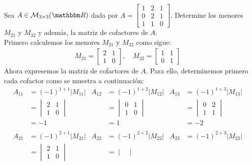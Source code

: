 \begin{example}
    Sea $A \in \mathcal{M}_{3 \times 3}(\RR)$ dada por $A = \begin{bmatrix}
        1 & 2 & 1 \\
        0 & 2 & 1 \\
        1 & 1 & 0
    \end{bmatrix}$. Determine los menores $M_{21}$ y $M_{32}$ y además, la matriz de cofactores de $A$. \\
    \solucion Primero calculemos los menores $M_{21}$ y $M_{32}$ como sigue:
    \begin{align*}
        M_{21} = \begin{bmatrix}
            2 & 1 \\
            1 & 0
        \end{bmatrix}, \quad M_{32} = \begin{bmatrix}
            1 & 1 \\
            0 & 1
        \end{bmatrix}
    \end{align*}
    Ahora expresemos la matriz de cofactores de $A$. Para ello, determinemos primero cada cofactor como se muestra a continuación:
    \begin{align*}
        A_{11} & = (-1)^{1+1} |M_{11}| & A_{12} & = (-1)^{1+2} |M_{12}| & A_{13} & = (-1)^{1+3} |M_{13}| \\
        & = \begin{vmatrix}
            2 & 1 \\
            1 & 0
        \end{vmatrix} & & = \begin{vmatrix}
            0 & 1 \\
            1 & 0
        \end{vmatrix} & & = \begin{vmatrix}
            0 & 2 \\
            1 & 1
        \end{vmatrix} \\
        & = -1 & & = 1 & & = -2 \\
        & \\
        A_{21} & = (-1)^{2+1} |M_{21}| & A_{22} & = (-1)^{2+2} |M_{22}| & A_{23} & = (-1)^{2+3} |M_{23}| \\
        & = \begin{vmatrix}
            2 & 1 \\
            1 & 0
        \end{vmatrix} & & = \begin{vmatrix}

\end{vmatrix}
\end{align*}
\end{example}
